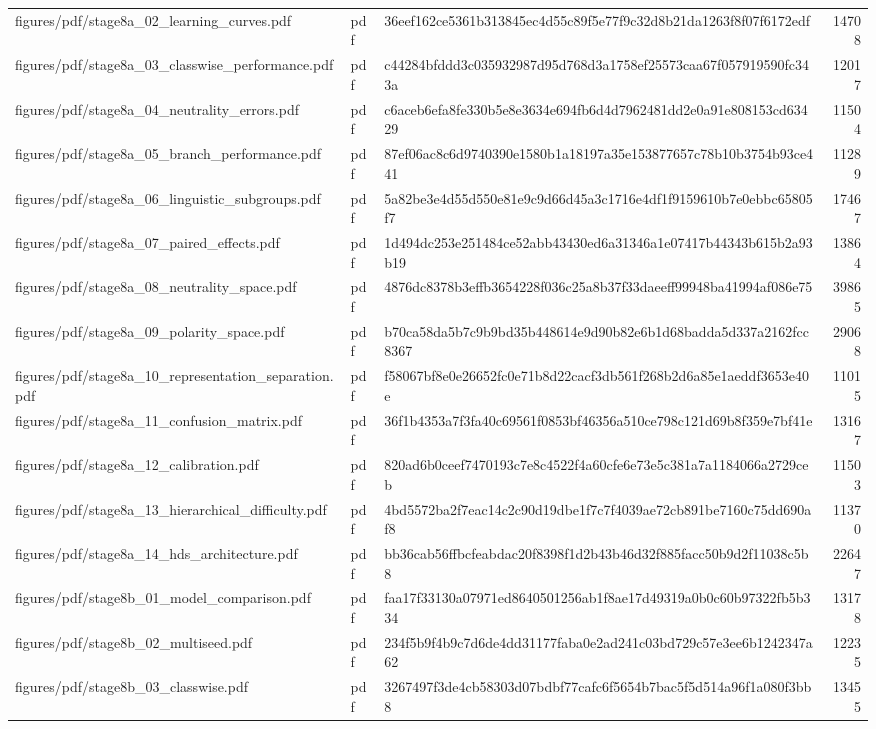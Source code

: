 \begin{tabular}{lllr}
figures/pdf/stage8a_02_learning_curves.pdf & pdf & 36eef162ce5361b313845ec4d55c89f5e77f9c32d8b21da1263f8f07f6172edf & 14708 \\
figures/pdf/stage8a_03_classwise_performance.pdf & pdf & c44284bfddd3c035932987d95d768d3a1758ef25573caa67f057919590fc343a & 12017 \\
figures/pdf/stage8a_04_neutrality_errors.pdf & pdf & c6aceb6efa8fe330b5e8e3634e694fb6d4d7962481dd2e0a91e808153cd63429 & 11504 \\
figures/pdf/stage8a_05_branch_performance.pdf & pdf & 87ef06ac8c6d9740390e1580b1a18197a35e153877657c78b10b3754b93ce441 & 11289 \\
figures/pdf/stage8a_06_linguistic_subgroups.pdf & pdf & 5a82be3e4d55d550e81e9c9d66d45a3c1716e4df1f9159610b7e0ebbc65805f7 & 17467 \\
figures/pdf/stage8a_07_paired_effects.pdf & pdf & 1d494dc253e251484ce52abb43430ed6a31346a1e07417b44343b615b2a93b19 & 13864 \\
figures/pdf/stage8a_08_neutrality_space.pdf & pdf & 4876dc8378b3effb3654228f036c25a8b37f33daeeff99948ba41994af086e75 & 39865 \\
figures/pdf/stage8a_09_polarity_space.pdf & pdf & b70ca58da5b7c9b9bd35b448614e9d90b82e6b1d68badda5d337a2162fcc8367 & 29068 \\
figures/pdf/stage8a_10_representation_separation.pdf & pdf & f58067bf8e0e26652fc0e71b8d22cacf3db561f268b2d6a85e1aeddf3653e40e & 11015 \\
figures/pdf/stage8a_11_confusion_matrix.pdf & pdf & 36f1b4353a7f3fa40c69561f0853bf46356a510ce798c121d69b8f359e7bf41e & 13167 \\
figures/pdf/stage8a_12_calibration.pdf & pdf & 820ad6b0ceef7470193c7e8c4522f4a60cfe6e73e5c381a7a1184066a2729ceb & 11503 \\
figures/pdf/stage8a_13_hierarchical_difficulty.pdf & pdf & 4bd5572ba2f7eac14c2c90d19dbe1f7c7f4039ae72cb891be7160c75dd690af8 & 11370 \\
figures/pdf/stage8a_14_hds_architecture.pdf & pdf & bb36cab56ffbcfeabdac20f8398f1d2b43b46d32f885facc50b9d2f11038c5b8 & 22647 \\
figures/pdf/stage8b_01_model_comparison.pdf & pdf & faa17f33130a07971ed8640501256ab1f8ae17d49319a0b0c60b97322fb5b334 & 13178 \\
figures/pdf/stage8b_02_multiseed.pdf & pdf & 234f5b9f4b9c7d6de4dd31177faba0e2ad241c03bd729c57e3ee6b1242347a62 & 12235 \\
figures/pdf/stage8b_03_classwise.pdf & pdf & 3267497f3de4cb58303d07bdbf77cafc6f5654b7bac5f5d514a96f1a080f3bb8 & 13455 \\

\end{tabular}
